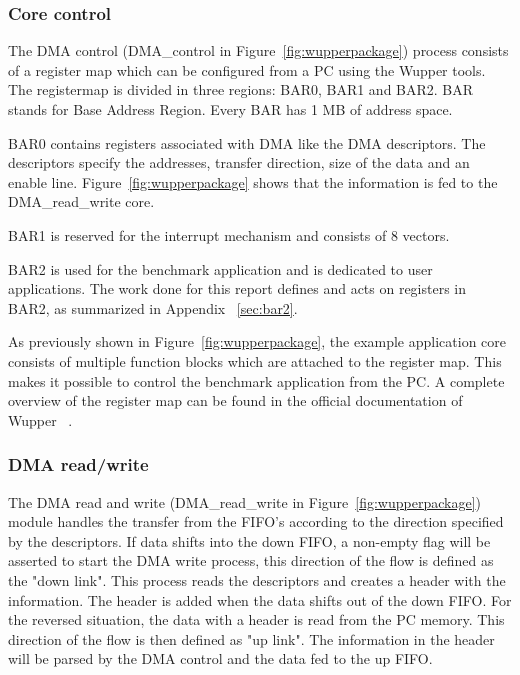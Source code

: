\subsubsection {Core control} 
The DMA control (DMA\_control in Figure~\ref{fig:wupperpackage}) process consists of a register map which can be configured from a PC using the Wupper tools. The registermap is divided in three regions: BAR0, BAR1 and BAR2. BAR stands for Base Address Region. Every BAR has 1 MB of address space.

BAR0 contains registers associated with DMA like the DMA descriptors. The descriptors specify the addresses, transfer direction, size of the data and an enable line. Figure~\ref{fig:wupperpackage} shows that the information is fed to the DMA\_read\_write core.

BAR1 is reserved for the interrupt mechanism and consists of 8 vectors.

BAR2 is used for the benchmark application and is dedicated to user applications. The work done for this report defines and acts on registers in BAR2, as summarized in Appendix ~\ref{sec:bar2}. 



 As previously shown in Figure~\ref{fig:wupperpackage}, the example application core consists of multiple function blocks which are attached to the register map. This makes it possible to control the benchmark application from the PC. 
A complete overview of the register map can be found in the official documentation of Wupper ~\cite{wupperoffical}.






\newpage
\subsubsection {DMA read/write}
The DMA read and write (DMA\_read\_write in Figure~\ref{fig:wupperpackage}) module handles the transfer from the FIFO's according to the direction specified by the descriptors. If data shifts into the down FIFO, a non-empty flag will be asserted to start the DMA write process, this direction of the flow is defined as the "down link". This process reads the descriptors and creates a header with the information. The header is added when the data shifts out of the down FIFO. For the reversed situation, the data with a header is read from the PC memory. This direction of the flow is then defined as "up link". The information in the header will be parsed by the DMA control and the data fed to the up FIFO.




